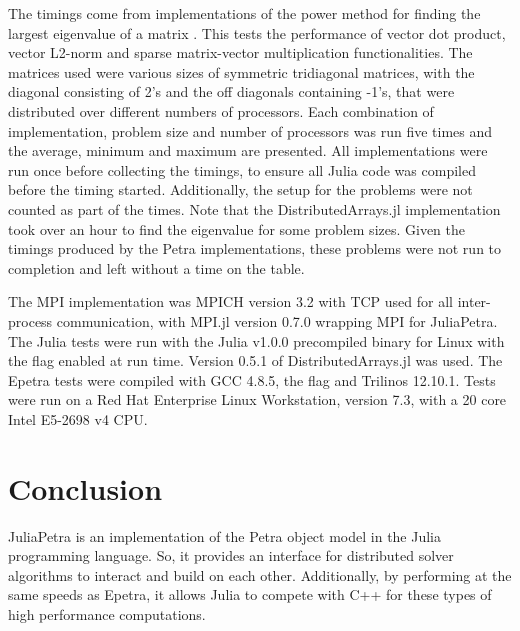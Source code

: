 \documentclass[acmsmall]{acmart}
\newcommand{\snippet}[1]{\texttt{\detokenize{#1}}}
\begin{document}
The timings come from implementations of the power method for finding the largest eigenvalue of a matrix
\cite{Gu:2000:PowerMethod}.
This tests the performance of vector dot product, vector L2-norm and sparse matrix-vector multiplication functionalities.
The matrices used were various sizes of symmetric tridiagonal matrices, with the diagonal consisting of 2's
and the off diagonals containing -1's, that were distributed over different numbers of processors.
Each combination of implementation, problem size and number of processors was run five times
and the average, minimum and maximum are presented.
All implementations were run once before collecting the timings, to ensure all Julia code was
compiled before the timing started.
Additionally, the setup for the problems were not counted as part of the times.
Note that the DistributedArrays.jl implementation took over an hour to find the eigenvalue for some problem sizes.
Given the timings produced by the Petra implementations, these problems were not run to completion and left without a time on the table.

The MPI implementation was MPICH version 3.2 with TCP used for all inter-process communication, with MPI.jl version 0.7.0 wrapping MPI for JuliaPetra.
The Julia tests were run with the Julia v1.0.0 precompiled binary for Linux with the \snippet{-O3} flag enabled at run time.
Version 0.5.1 of DistributedArrays.jl was used.
The Epetra tests were compiled with GCC 4.8.5, the \snippet{-O3} flag and Trilinos 12.10.1.
Tests were run on a Red Hat Enterprise Linux Workstation, version 7.3,
with a 20 core Intel E5-2698 v4 CPU.

\section{Conclusion}

JuliaPetra is an implementation of the Petra object model in the Julia programming language.
So, it provides an interface for distributed solver algorithms to interact and build on each other.
Additionally, by performing at the same speeds as Epetra,
it allows Julia to compete with C++ for these types of high performance computations.



\end{document}
